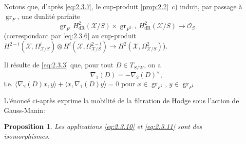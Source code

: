 \documentclass[12pt,a4paper]{article}
\theoremstyle{plain}
\newtheorem{proposition}[theorem]{Proposition}
\theoremstyle{definition}
\theoremstyle{remark}
\DeclareMathOperator{\gr}{gr}
\begin{document}
Notons que, d'après \eqref{eq:2.3.7}, le cup-produit \ref{prop:2.2}~c) induit, par passage à $\gr_F$, une dualité parfaite
\begin{equation}\label{eq:2.3.13}
\gr_{F^i} H^2_{\mathrm{dR}}(\mathcal{X}/S) \times \gr_{F^{2-i}} H^2_{\mathrm{dR}}(\mathcal{X}/S) \to \mathcal{O}_S
\end{equation}
(correspondant par \eqref{eq:2.3.6} au cup-produit $H^{2-i}(\mathcal{X}, \Omega^i_{\mathcal{X}/S}) \otimes H^i(\mathcal{X}, \Omega^{2-i}_{\mathcal{X}/S}) \to H^2(\mathcal{X}, \Omega^2_{\mathcal{X}/S})$).

Il résulte de \eqref{eq:2.3.3} que, pour tout $D \in T_{S/W}$, on a
\begin{equation}\label{eq:2.3.14}
\nabla_1(D) = -\nabla_2(D)^{\vee},
\end{equation}
i.e. $\langle \nabla_2(D)x, y \rangle + \langle x, \nabla_1(D)y \rangle = 0$ pour $x \in \gr_{F^2}$, $y \in \gr_{F^1}$.

L'énoncé ci-après exprime la mobilité de la filtration de Hodge sous l'action de Gauss-Manin:

\begin{proposition}\label{prop:2.4}
Les applications \eqref{eq:2.3.10} et \eqref{eq:2.3.11} sont des isomorphismes.
\end{proposition}
\end{document}
